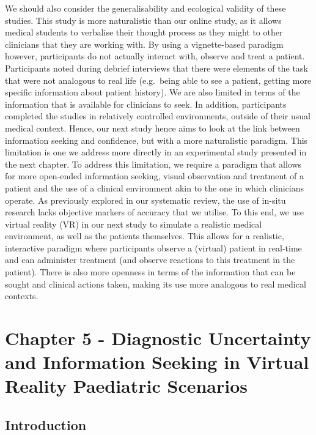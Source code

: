 \documentclass[a4paper, nobind]{templates/ociamthesis}
\begin{document}
We should also consider the generalisability and ecological validity of these studies. This study is more naturalistic than our online study, as it allows medical students to verbalise their thought process as they might to other clinicians that they are working with. By using a vignette-based paradigm however, participants do not actually interact with, observe and treat a patient. Participants noted during debrief interviews that there were elements of the task that were not analogous to real life (e.g.~being able to see a patient, getting more specific information about patient history). We are also limited in terms of the information that is available for clinicians to seek. In addition, participants completed the studies in relatively controlled environments, outside of their usual medical context. Hence, our next study hence aims to look at the link between information seeking and confidence, but with a more naturalistic paradigm. This limitation is one we address more directly in an experimental study presented in the next chapter. To address this limitation, we require a paradigm that allows for more open-ended information seeking, visual observation and treatment of a patient and the use of a clinical environment akin to the one in which clinicians operate. As previously explored in our systematic review, the use of in-situ research lacks objective markers of accuracy that we utilise. To this end, we use virtual reality (VR) in our next study to simulate a realistic medical environment, as well as the patients themselves. This allows for a realistic, interactive paradigm where participants observe a (virtual) patient in real-time and can administer treatment (and observe reactions to this treatment in the patient). There is also more openness in terms of the information that can be sought and clinical actions taken, making its use more analogous to real medical contexts.

\chapter*{Chapter 5 - Diagnostic Uncertainty and Information Seeking in Virtual Reality Paediatric Scenarios}\label{chapter-5---diagnostic-uncertainty-and-information-seeking-in-virtual-reality-paediatric-scenarios}

\adjustmtc
{}

\section*{Introduction}\label{introduction-3}
\end{document}
